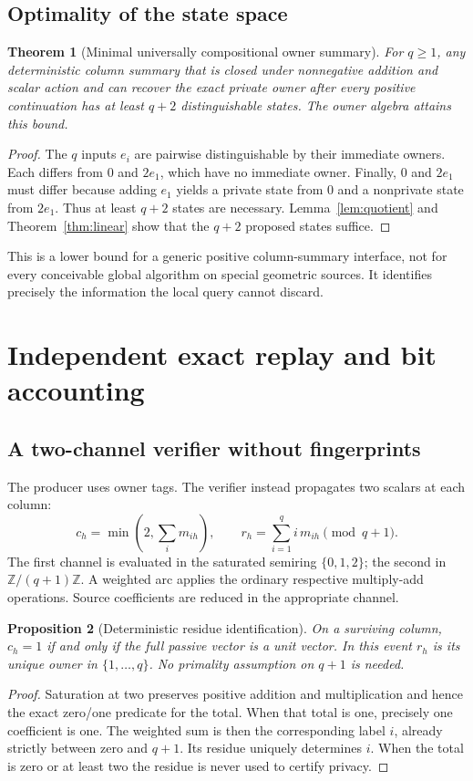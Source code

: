 \documentclass[11pt,letterpaper]{article}
\newtheorem{theorem}{Theorem}[section]
\newtheorem{proposition}[theorem]{Proposition}
\theoremstyle{definition}
\begin{document}
\subsection{Optimality of the state space}
\begin{theorem}[Minimal universally compositional owner summary]\label{thm:minimal}
For $q\ge1$, any deterministic column summary that is closed under nonnegative addition and scalar action and can recover the exact private owner after every positive continuation has at least $q+2$ distinguishable states. The owner algebra attains this bound.
\end{theorem}
\begin{proof}
The $q$ inputs $e_i$ are pairwise distinguishable by their immediate owners. Each differs from $0$ and $2e_1$, which have no immediate owner. Finally, $0$ and $2e_1$ must differ because adding $e_1$ yields a private state from $0$ and a nonprivate state from $2e_1$. Thus at least $q+2$ states are necessary. Lemma~\ref{lem:quotient} and Theorem~\ref{thm:linear} show that the $q+2$ proposed states suffice.
\end{proof}

This is a lower bound for a generic positive column-summary interface, not for every conceivable global algorithm on special geometric sources. It identifies precisely the information the local query cannot discard.

\section{Independent exact replay and bit accounting}\label{sec:bits}
\subsection{A two-channel verifier without fingerprints}
The producer uses owner tags. The verifier instead propagates two scalars at each column:
\[
 c_h=\min\!\left(2,\sum_i m_{ih}\right),\qquad
 r_h=\sum_{i=1}^q i\,m_{ih}\pmod{q+1}.
\]
The first channel is evaluated in the saturated semiring $\{0,1,2\}$; the second in $\mathbb Z/(q+1)\mathbb Z$. A weighted arc applies the ordinary respective multiply-add operations. Source coefficients are reduced in the appropriate channel.

\begin{proposition}[Deterministic residue identification]\label{prop:residue}
On a surviving column, $c_h=1$ if and only if the full passive vector is a unit vector. In this event $r_h$ is its unique owner in $\{1,\ldots,q\}$. No primality assumption on $q+1$ is needed.
\end{proposition}
\begin{proof}
Saturation at two preserves positive addition and multiplication and hence the exact zero/one predicate for the total. When that total is one, precisely one coefficient is one. The weighted sum is then the corresponding label $i$, already strictly between zero and $q+1$. Its residue uniquely determines $i$. When the total is zero or at least two the residue is never used to certify privacy.
\end{proof}
\end{document}
